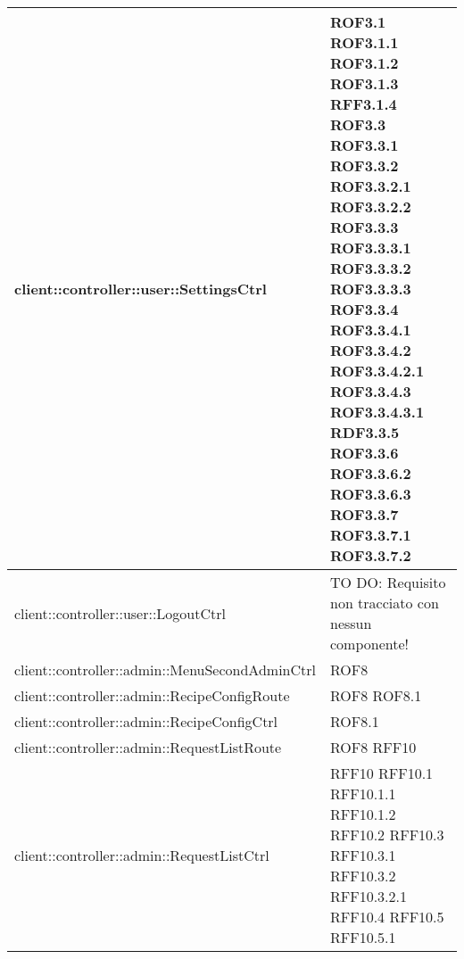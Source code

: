 \begin{center}
\begin{longtable}{| p{11cm} | p{2.5cm} |}
\hline
client::controller::user::SettingsCtrl & ROF3.1 \newline ROF3.1.1 \newline ROF3.1.2 \newline ROF3.1.3 \newline RFF3.1.4 \newline ROF3.3 \newline ROF3.3.1 \newline ROF3.3.2 \newline ROF3.3.2.1 \newline ROF3.3.2.2 \newline ROF3.3.3 \newline ROF3.3.3.1 \newline ROF3.3.3.2 \newline ROF3.3.3.3 \newline ROF3.3.4 \newline ROF3.3.4.1 \newline ROF3.3.4.2 \newline ROF3.3.4.2.1 \newline ROF3.3.4.3 \newline ROF3.3.4.3.1 \newline RDF3.3.5 \newline ROF3.3.6 \newline ROF3.3.6.2 \newline ROF3.3.6.3 \newline ROF3.3.7 \newline ROF3.3.7.1 \newline ROF3.3.7.2 \\
\hline
client::controller::user::LogoutCtrl & TO DO: Requisito non tracciato con nessun componente! \\
\hline
client::controller::admin::MenuSecondAdminCtrl & ROF8 \\
\hline
client::controller::admin::RecipeConfigRoute & ROF8 \newline ROF8.1 \\
\hline
client::controller::admin::RecipeConfigCtrl & ROF8.1 \\
\hline
client::controller::admin::RequestListRoute & ROF8 \newline RFF10 \\
\hline
client::controller::admin::RequestListCtrl & RFF10 \newline RFF10.1 \newline RFF10.1.1 \newline RFF10.1.2 \newline RFF10.2 \newline RFF10.3 \newline RFF10.3.1 \newline RFF10.3.2 \newline RFF10.3.2.1 \newline RFF10.4 \newline RFF10.5 \newline RFF10.5.1 \\

\end{longtable}
\end{center}
